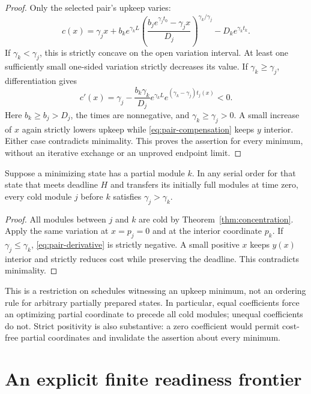 \begin{proof}
Only the selected pair's upkeep varies:
\begin{equation}
 c(x)=\gamma_jx+
 b_k e^{\gamma_k L}
 \left(\frac{b_j e^{\gamma_jt_0}-\gamma_jx}{D_j}\right)^{\gamma_k/\gamma_j}
 -D_k e^{\gamma_k t_k}.
 \label{eq:pair-cost}
\end{equation}
If \(\gamma_k<\gamma_j\), this is strictly concave on the open variation
interval. At least one sufficiently small one-sided variation strictly
decreases its value. If \(\gamma_k\geq\gamma_j\), differentiation gives
\begin{equation}
 c'(x)=\gamma_j-
 \frac{b_k\gamma_k}{D_j}
 e^{\gamma_k L}e^{(\gamma_k-\gamma_j)t_j(x)}<0.
 \label{eq:pair-derivative}
\end{equation}
Here \(b_k\geq b_j>D_j\), the times are nonnegative, and
\(\gamma_k\geq\gamma_j>0\). A small increase of \(x\) again strictly lowers
upkeep while \eqref{eq:pair-compensation} keeps \(y\) interior.
Either case contradicts minimality. This proves the assertion for every
minimum, without an iterative exchange or an unproved endpoint limit.
\end{proof}

\begin{corollary}
\label{cor:prefix}
Suppose a minimizing state has a partial module \(k\). In any serial order
for that state that meets deadline \(H\) and transfers its initially full
modules at time zero, every cold module \(j\) before \(k\) satisfies
\(\gamma_j>\gamma_k\).
\end{corollary}
\begin{proof}
All modules between \(j\) and \(k\) are cold by
Theorem~\ref{thm:concentration}. Apply the same variation at \(x=p_j=0\)
and at the interior coordinate \(p_k\). If \(\gamma_j\leq\gamma_k\),
\eqref{eq:pair-derivative} is strictly negative. A small positive \(x\)
keeps \(y(x)\) interior and strictly reduces cost while preserving the
deadline. This contradicts minimality.
\end{proof}

This is a restriction on schedules witnessing an upkeep minimum, not an
ordering rule for arbitrary partially prepared states. In particular, equal
coefficients force an optimizing partial coordinate to precede all cold
modules; unequal coefficients do not. Strict positivity is also substantive:
a zero coefficient would permit cost-free partial coordinates and invalidate
the assertion about every minimum.

\section{An explicit finite readiness frontier}
\label{sec:frontier}

